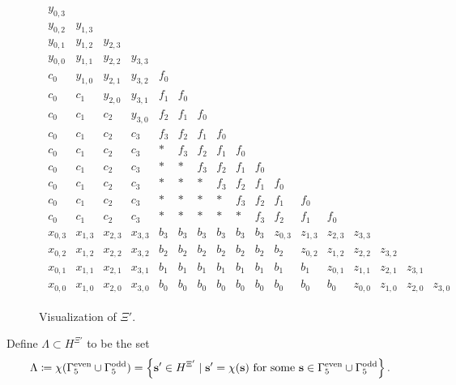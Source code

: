 \begin{figure}
    \begin{align*}
        \begin{array}{cccccccccccccccccccc}
            y_{0,3} & & & & & & & & & & & & \\
            y_{0,2} & y_{1,3} & & & & & & & & & & & \\
            y_{0,1} & y_{1,2} & y_{2,3} & & & & & & & & & & \\
            y_{0,0} & y_{1,1} & y_{2,2} & y_{3,3} & & & & & & & & & \\
            c_0 & y_{1,0} & y_{2,1} & y_{3,2} & f_0 & & & & & & & & \\
            c_0 & c_1 & y_{2,0} & y_{3,1} & f_1 & f_0 & & & & & & & \\
            c_0 & c_1 & c_2 & y_{3,0} & f_2 & f_1 & f_0 & & & & & & \\
            c_0 & c_1 & c_2 & c_3 & f_3 & f_2 & f_1 & f_0 & & & & & \\
            c_0 & c_1 & c_2 & c_3 &  *  & f_3 & f_2 & f_1 & f_0 & & & & \\
            c_0 & c_1 & c_2 & c_3 &  *  & * & f_3 & f_2 & f_1 & f_0 & & & \\
            c_0 & c_1 & c_2 & c_3 &  *  & * & * & f_3 & f_2 & f_1 & f_0 & & \\
            c_0 & c_1 & c_2 & c_3 &  *  & * & * & * & f_3 & f_2 & f_1 & f_0 & \\
            c_0 & c_1 & c_2 & c_3 &  *  & * & * & * & * & f_3 & f_2 & f_1 & f_0 \\
            x_{0,3} & x_{1,3} & x_{2,3} & x_{3,3} & b_3 & b_3 & b_3 & b_3 & b_3 & b_3 & z_{0,3} & z_{1,3} & z_{2,3} & z_{3,3} \\
            x_{0,2} & x_{1,2} & x_{2,2} & x_{3,2} & b_2 & b_2 & b_2 & b_2 & b_2 & b_2 & b_2 & z_{0,2} & z_{1,2} & z_{2,2} & z_{3,2} \\
            x_{0,1} & x_{1,1} & x_{2,1} & x_{3,1} & b_1 & b_1 & b_1 & b_1 & b_1 & b_1 & b_1 & b_1 & z_{0,1} & z_{1,1} & z_{2,1} & z_{3,1} \\
            x_{0,0} & x_{1,0} & x_{2,0} & x_{3,0} & b_0 & b_0 & b_0 & b_0 & b_0 & b_0 & b_0 & b_0 & b_0 & z_{0,0} & z_{1,0} & z_{2,0} & z_{3,0}
        \end{array}
    \end{align*}  
    \caption{Visualization of \( \Xi' \).}
\end{figure}

\begin{definition}
    Define \( \Lambda \subset H^{\Xi'} \) to be the set 
    \begin{align*}
        \Lambda  \coloneqq \chi( \Gamma^{\mathrm{even}}_5 \cup \Gamma^{\mathrm{odd}}_5 ) = \left\{ \mathbf{s}' \in H^{\Xi'} \mid \mathbf{s}' = \chi(\mathbf{s}) \text{ for some \( \mathbf{s} \in  \Gamma^{\mathrm{even}}_5 \cup \Gamma^{\mathrm{odd}}_5 \)}\right\}.
    \end{align*}
\end{definition}

